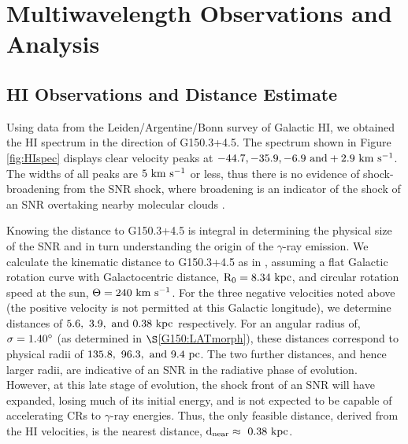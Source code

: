 \documentclass[iop]{emulateapj}
\newcommand{\gam}{$\gamma$-ray}
\newcommand{\Gone}{G150.3+4.5}
\begin{document}
%
%

\section{Multiwavelength  Observations and  Analysis }\label{G150:Multiwave}
\subsection{HI Observations and Distance Estimate}\label{G150:HI}
Using data from the Leiden/Argentine/Bonn survey of Galactic HI, we obtained the HI spectrum in the direction of \Gone{}. The spectrum shown in Figure \ref{fig:HIspec}  displays clear velocity peaks at ${\rm -44.7, -35.9, -6.9~and +2.9~km~s^{-1}}$. The widths of all peaks are ${\rm 5~km~s^{-1}}$ or less, thus there is no evidence of shock-broadening from the SNR shock, where broadening is an indicator of the shock of an SNR overtaking nearby molecular clouds \cite{Wooten77,Wooten81}.

\begin{figure}[!ht]
	\begin{centering}
		\texttt{[image: Figures/\{HIspec]}.png}
		\caption[HI spectrum in the direction of \Gone{}]{\Gone{} HI spectrum. 
			\label{fig:HIspec}}
	\end{centering}
\end{figure}

Knowing the distance to \Gone{} is integral in determining the physical size of the SNR and in turn understanding the origin of the \gam{} emission. We calculate the kinematic distance to \Gone{} as in \cite{Reid14}, assuming a flat Galactic rotation curve with Galactocentric distance, ${\rm R_0 =  8.34~kpc}$, and circular rotation speed at the sun, ${\rm \Theta = 240~km~s^{-1}}$. For the three negative velocities noted above (the positive velocity is not permitted at this Galactic longitude), we determine distances of ${\rm 5.6,~3.9,~and~0.38~kpc}$ respectively. For an angular radius of, ${\rm \sigma = 1.40^{\circ}}$ (as determined in $\S$\ref{G150:LATmorph}), these distances correspond to physical radii of ${\rm 135.8,~96.3,~and~9.4~pc}$. The two further distances, and hence larger radii, are indicative of an SNR in the radiative phase of evolution. However, at this late stage of evolution,  the shock front of an SNR will have expanded,  losing much of its initial energy, and is not expected to be capable of accelerating CRs to \gam{} energies. Thus, the only feasible distance, derived from the HI velocities, is the nearest distance,  ${\rm d_{near} \approx \ 0.38~kpc}$.
\end{document}
